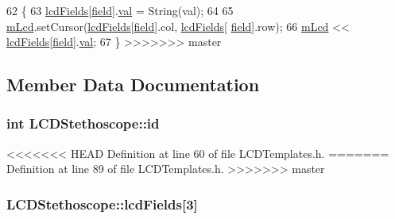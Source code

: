 \begin{DoxyCode}
\begin{DoxyCode}
\begin{DoxyCode}
62                                                      \{
63   \hyperlink{class_l_c_d_stethoscope_ad36003e685beee5f2268fd4ef1f0db8c}{lcdFields}[\hyperlink{_l_c_d_templates_8h_a20a49e010fbfc3a43959f12d92e01bb6}{field}].\hyperlink{struct_l_c_d_template_field_a6eb7ce0547fc28ac3a2538f0fac3f117}{val} = String(val);
64 
65   \hyperlink{class_l_c_d_stethoscope_af91304920f29b700ae27aee8aba23ac1}{mLcd}.setCursor(\hyperlink{class_l_c_d_stethoscope_ad36003e685beee5f2268fd4ef1f0db8c}{lcdFields}[\hyperlink{struct_l_c_d_template_field}{field}].col, \hyperlink{class_l_c_d_stethoscope_ad36003e685beee5f2268fd4ef1f0db8c}{lcdFields}[
      \hyperlink{struct_l_c_d_template_field}{field}].row);
66   \hyperlink{class_l_c_d_stethoscope_af91304920f29b700ae27aee8aba23ac1}{mLcd} << \hyperlink{class_l_c_d_stethoscope_ad36003e685beee5f2268fd4ef1f0db8c}{lcdFields}[\hyperlink{_l_c_d_templates_8h_a20a49e010fbfc3a43959f12d92e01bb6}{field}].\hyperlink{struct_l_c_d_template_field_a6eb7ce0547fc28ac3a2538f0fac3f117}{val};
67 \}
>>>>>>> master
\end{DoxyCode}


\subsection{Member Data Documentation}
\hypertarget{class_l_c_d_stethoscope_a865d5b5da67eb0841c34b1a436ef28ba}{
\subsubsection[{id}]{\setlength{\rightskip}{0pt plus 5cm}int L\-C\-D\-Stethoscope\-::id}}\label{class_l_c_d_stethoscope_a865d5b5da67eb0841c34b1a436ef28ba}


<<<<<<< HEAD
Definition at line 60 of file L\-C\-D\-Templates.\-h.
=======
Definition at line 89 of file L\-C\-D\-Templates.\-h.
>>>>>>> master

\hypertarget{class_l_c_d_stethoscope_ad36003e685beee5f2268fd4ef1f0db8c}{
\subsubsection[{lcd\-Fields}]{ L\-C\-D\-Stethoscope\-::lcd\-Fields\mbox{[}3\mbox{]}}}\label{class_l_c_d_stethoscope_ad36003e685beee5f2268fd4ef1f0db8c}



\end{DoxyCode}
\end{DoxyCode}
